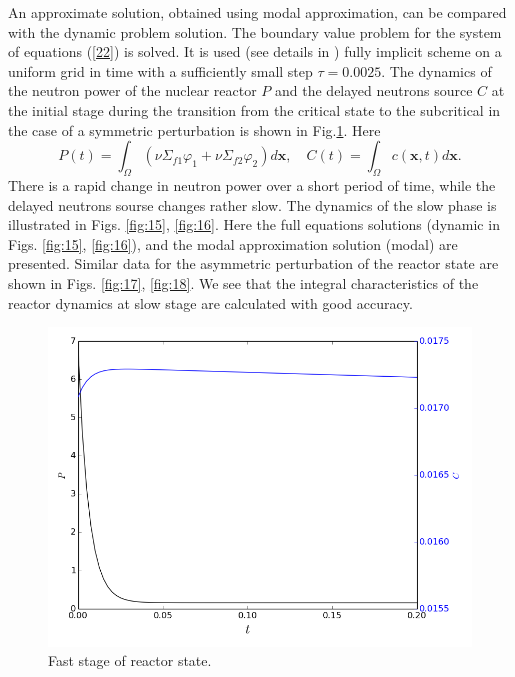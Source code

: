 \documentclass[authoryear]{elsarticle}
\begin{document}
An approximate solution, obtained using modal approximation, can be compared with the dynamic problem solution. The boundary value problem for the system of equations (\ref{22}) is solved. 
It is used (see details in
\cite{nd-mm}) fully implicit scheme on a uniform grid in time with a sufficiently small step $\tau = 0.0025$.
The dynamics of the neutron power of the nuclear reactor $P$ and the delayed neutrons source $C$ 
at the initial stage during the transition from the critical state to the subcritical in the case of a symmetric perturbation is shown in Fig.\ref{fig:14}. 
Here 
\[
 P(t) = \int_{\Omega} (\nu\Sigma_{f1} \varphi_1 + \nu\Sigma_{f2} \varphi_2)  d \bm x,
 \quad C(t) = \int_{\Omega} c(\bm x,t) d \bm x.
\] 
There is a rapid change in neutron power over a short period of time, while the delayed neutrons sourse changes rather slow. The dynamics of the slow phase is illustrated in Figs. \ref{fig:15}, \ref{fig:16}. 
Here the full equations solutions (dynamic in Figs. \ref{fig:15}, \ref{fig:16}),
and the modal approximation solution (modal) are presented. Similar data for the asymmetric perturbation of the reactor state are shown in Figs. \ref{fig:17}, \ref{fig:18}. 
We see that the integral characteristics of the reactor dynamics at slow stage are calculated with good accuracy.

\begin{figure}[!h]
  \begin{center}
    \includegraphics[width=0.9\linewidth] {14.png}
	\caption{Fast stage of reactor state.}
	\label{fig:14}
  \end{center}
\end{figure} 
\end{document}
